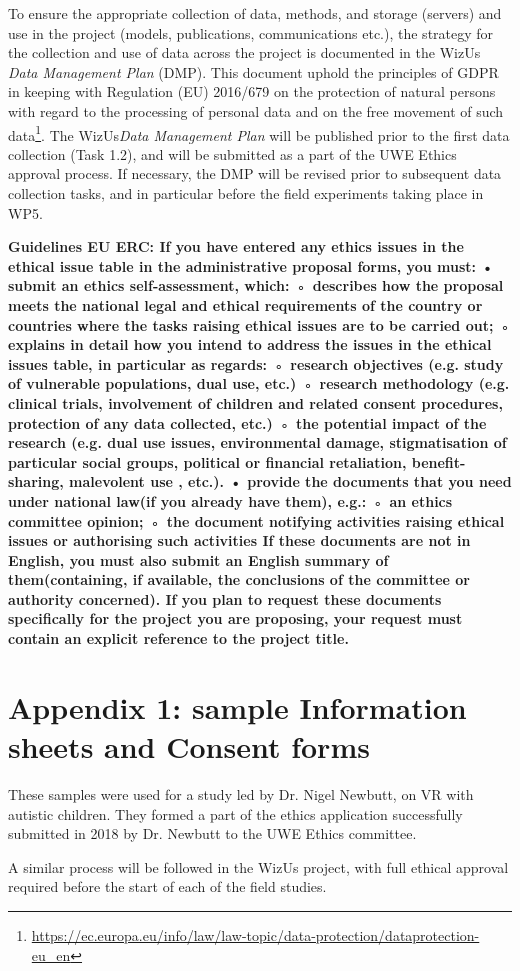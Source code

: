 \documentclass[11pt,a4paper]{report}
\newcommand{\project}{WizUs\xspace}
\newcommand{\eu}[1]{{\color{teal}\textbf{Guidelines EU ERC: #1}}}
\begin{document}
To ensure the appropriate collection of data, methods, and storage (servers) and
use in the project (models, publications, communications etc.), the strategy for
the collection and use of data across the project is documented in the \project
\emph{Data Management Plan} (DMP). This document uphold the principles of GDPR in
keeping with Regulation (EU) 2016/679 on the protection of natural persons with
regard to the processing of personal data and on the free movement of such
data\footnote{\url{https://ec.europa.eu/info/law/law-topic/data-protection/dataprotection-eu_en}}.
The \project \emph{Data Management Plan} will be published prior to the first
data collection (Task 1.2), and will be submitted as a part of the UWE Ethics
approval process. If necessary, the DMP will be revised prior to subsequent data
collection tasks, and in particular before the field experiments taking place in
WP5.

 
\eu{
If you have entered any ethics issues in the ethical issue table in the administrative proposal forms, you must:
    • submit an ethics self-assessment, which:
        ◦ describes how the proposal meets the national legal and ethical requirements of the country or countries where the tasks raising ethical issues are to be carried out;
        ◦ explains in detail how you intend to address the issues in the ethical issues table, in particular as regards:
        ◦ research objectives (e.g. study of vulnerable populations, dual use, etc.)
        ◦ research methodology (e.g. clinical trials, involvement of children and related consent procedures, protection of any data collected, etc.)
        ◦ the potential impact of the research (e.g. dual use issues, environmental damage, stigmatisation  of  particular  social  groups,  political  or  financial  retaliation, benefit-sharing,  malevolent use , etc.).
    • provide the documents that you need under national law(if you already have them), e.g.:
        ◦ an ethics committee opinion;
        ◦ the document notifying activities raising ethical issues or authorising such activities
 If these documents are not in English, you must also submit an English summary of them(containing, if available, the conclusions of the committee or authority concerned).
 If you plan to request these documents specifically for the project you are
 proposing, your request must contain an explicit reference to the project
 title.
}

\newpage
\section{Appendix 1: sample Information sheets and Consent forms}

These samples were used for a study led by Dr. Nigel Newbutt, on VR with
autistic children. They formed a part of the ethics application successfully
submitted in 2018 by Dr. Newbutt to the UWE Ethics committee.

A similar process will be followed in the \project project, with full ethical
approval required before the start of each of the field studies.


\end{document}
